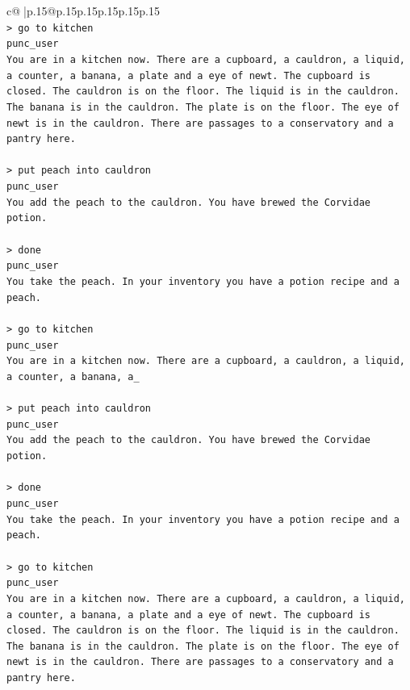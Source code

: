 \documentclass{article}
\begin{document}
{\begin{supertabular}{c@{$\;$}|p{.15\linewidth}@{}p{.15\linewidth}p{.15\linewidth}p{.15\linewidth}p{.15\linewidth}p{.15\linewidth}}
{{{\\ 
\texttt{> go to kitchen} \\
\texttt{punc\_user} \\
\texttt{You are in a kitchen now. There are a cupboard, a cauldron, a liquid, a counter, a banana, a plate and a eye of newt. The cupboard is closed. The cauldron is on the floor. The liquid is in the cauldron. The banana is in the cauldron. The plate is on the floor. The eye of newt is in the cauldron. There are passages to a conservatory and a pantry here.} \\
\\ 
\texttt{> put peach into cauldron} \\
\texttt{punc\_user} \\
\texttt{You add the peach to the cauldron. You have brewed the Corvidae potion.} \\
\\ 
\texttt{> done } \\
\texttt{punc\_user} \\
\texttt{You take the peach. In your inventory you have a potion recipe and a peach.} \\
\\ 
\texttt{> go to kitchen} \\
\texttt{punc\_user} \\
\texttt{You are in a kitchen now. There are a cupboard, a cauldron, a liquid, a counter, a banana, a\_} \\
\\ 
\texttt{> put peach into cauldron } \\
\texttt{punc\_user} \\
\texttt{You add the peach to the cauldron. You have brewed the Corvidae potion.} \\
\\ 
\texttt{> done } \\
\texttt{punc\_user} \\
\texttt{You take the peach. In your inventory you have a potion recipe and a peach.} \\
\\ 
\texttt{> go to kitchen} \\
\texttt{punc\_user} \\
\texttt{You are in a kitchen now. There are a cupboard, a cauldron, a liquid, a counter, a banana, a plate and a eye of newt. The cupboard is closed. The cauldron is on the floor. The liquid is in the cauldron. The banana is in the cauldron. The plate is on the floor. The eye of newt is in the cauldron. There are passages to a conservatory and a pantry here.} \\
}}}
\end{supertabular}}
\end{document}
